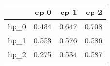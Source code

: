 \begin{tabular}{lrrr}
\toprule
{} &   ep 0 &   ep 1 &   ep 2 \\
\midrule
hp\_0 &  0.434 &  0.647 &  0.708 \\
hp\_1 &  0.553 &  0.576 &  0.586 \\
hp\_2 &  0.275 &  0.534 &  0.587 \\
\bottomrule
\end{tabular}

